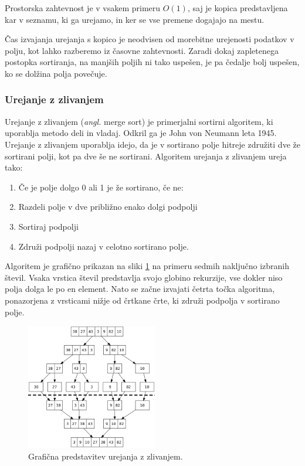 \documentclass[a4paper,oneside]{article}
\begin{document}
Prostorska zahtevnost je v vsakem primeru $O(1)$, saj je kopica predstavljena kar v
seznamu, ki ga urejamo, in ker se vse premene dogajajo na mestu.

Čas izvajanja urejanja s kopico je neodvisen od morebitne urejenosti podatkov v polju,
kot lahko razberemo iz časovne zahtevnosti. Zaradi dokaj zapletenega postopka sortiranja,
na manjših poljih ni tako uspešen, je pa čedalje bolj uspešen, ko se dolžina polja
povečuje.

\subsubsection{Urejanje z zlivanjem}
\label{chapter:mergesort}
Urejanje z zlivanjem (\emph{angl.} merge sort) je primerjalni sortirni algoritem, ki
uporablja metodo deli in vladaj. Odkril ga je John von Neumann leta 1945.
Urejanje z zlivanjem uporablja idejo, da je v sortirano polje hitreje združiti dve že
sortirani polji, kot pa dve še ne sortirani. 
Algoritem urejanja z zlivanjem ureja tako:
\begin{enumerate}
  \item Če je polje dolgo 0 ali 1 je že sortirano, če ne:
  \item Razdeli polje v dve približno enako dolgi podpolji
  \item Sortiraj podpolji 
  \item Združi podpolji nazaj v celotno sortirano polje.
\end{enumerate}

Algoritem je grafično prikazan na sliki \ref{fig:mergesortimage} na primeru sedmih
naključno izbranih števil.
Vsaka vrstica števil predstavlja svojo globino rekurzije, vse dokler niso polja dolga le
po en element. Nato se začne izvajati četrta točka algoritma, ponazorjena z vrsticami
nižje od črtkane črte, ki združi podpolja v sortirano polje.

\begin{figure}[h]
    \begin{center}
        \includegraphics[height=55mm]{slike/merge_sort.png}
    \end{center}
    \vspace{-0.7cm}
    \caption{Grafična predstavitev urejanja z zlivanjem.}
    \label{fig:mergesortimage}
\end{figure}
\end{document}

